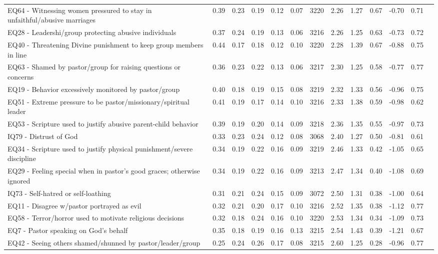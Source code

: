 \documentclass[
]{article}
\begin{document}
\begin{longtable}[t]{>{\raggedright\arraybackslash}p{2cm}cccccccccccc}
EQ64 - Witnessing women pressured to stay in unfaithful/abusive marriages & 0.39 & 0.23 & 0.19 & 0.12 & 0.07 & 3220 & 2.26 & 1.27 & 0.67 & -0.70 & 0.71 & \\
\addlinespace
EQ28 - Leadershi/group protecting abusive individuals & 0.37 & 0.24 & 0.19 & 0.13 & 0.06 & 3216 & 2.26 & 1.25 & 0.63 & -0.73 & 0.72 & \\
EQ40 - Threatening Divine punishment to keep group members in line & 0.44 & 0.17 & 0.18 & 0.12 & 0.10 & 3220 & 2.28 & 1.39 & 0.67 & -0.88 & 0.75 & \\
EQ63 - Shamed by pastor/group for raising questions or concerns & 0.36 & 0.23 & 0.22 & 0.13 & 0.06 & 3217 & 2.30 & 1.25 & 0.58 & -0.77 & 0.77 & \\
EQ19 - Behavior excessively monitored by pastor/group & 0.40 & 0.18 & 0.19 & 0.15 & 0.08 & 3219 & 2.32 & 1.33 & 0.56 & -0.96 & 0.75 & \\
EQ51 - Extreme pressure to be pastor/missionary/spiritual leader & 0.41 & 0.19 & 0.17 & 0.14 & 0.10 & 3216 & 2.33 & 1.38 & 0.59 & -0.98 & 0.62 & \\
\addlinespace
EQ53 - Scripture used to justify abusive parent-child behavior & 0.39 & 0.19 & 0.20 & 0.14 & 0.09 & 3218 & 2.36 & 1.35 & 0.55 & -0.97 & 0.73 & \\
IQ79 - Distrust of God & 0.33 & 0.23 & 0.24 & 0.12 & 0.08 & 3068 & 2.40 & 1.27 & 0.50 & -0.81 & 0.61 & \\
EQ34 - Scripture used to justify physical punishment/severe discipline & 0.34 & 0.19 & 0.22 & 0.16 & 0.09 & 3219 & 2.46 & 1.33 & 0.42 & -1.05 & 0.65 & \\
EQ29 - Feeling special when in pastor’s good graces; otherwise ignored & 0.34 & 0.19 & 0.22 & 0.16 & 0.09 & 3213 & 2.47 & 1.34 & 0.40 & -1.08 & 0.69 & \\
IQ73 - Self-hatred or self-loathing & 0.31 & 0.21 & 0.24 & 0.15 & 0.09 & 3072 & 2.50 & 1.31 & 0.38 & -1.00 & 0.64 & \\
\addlinespace
EQ11 - Disagree w/pastor portrayed as evil & 0.32 & 0.21 & 0.20 & 0.17 & 0.10 & 3216 & 2.52 & 1.35 & 0.38 & -1.12 & 0.77 & \\
EQ58 - Terror/horror used to motivate religious decisions & 0.32 & 0.18 & 0.24 & 0.16 & 0.10 & 3220 & 2.53 & 1.34 & 0.34 & -1.09 & 0.73 & \\
EQ7 - Pastor speaking on God's behalf & 0.35 & 0.18 & 0.19 & 0.16 & 0.13 & 3215 & 2.54 & 1.43 & 0.39 & -1.21 & 0.67 & \\
EQ42 - Seeing others shamed/shunned by pastor/leader/group & 0.25 & 0.24 & 0.26 & 0.17 & 0.08 & 3215 & 2.60 & 1.25 & 0.28 & -0.96 & 0.77 & \\

\end{longtable}
\end{document}
